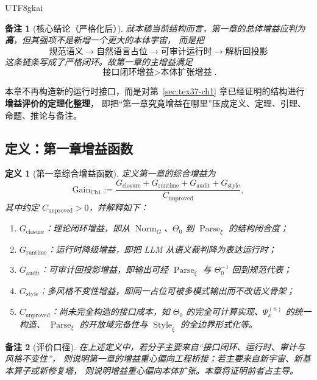 \documentclass[12pt]{article}
\newtheorem{definition}{定义}[section]
\newtheorem{remark}{备注}[section]
\newcommand{\Norm}{\operatorname{Norm}}
\newcommand{\Parse}{\operatorname{Parse}}
\newcommand{\Style}{\operatorname{Style}}
\begin{document}
\begin{CJK*}{UTF8}{gkai}
\begin{remark}[核心结论（严格化后）]
就本稿当前结构而言，第一章的总体增益应判为\textbf{高}，但其强项不是新增一个更大的本体宇宙，
而是把
\[
  \text{规范语义}
  \to
  \text{自然语言占位}
  \to
  \text{可审计运行时}
  \to
  \text{解析回投影}
\]
这条链条写成了严格闭环。故第一章的主增益满足
\[
  \boxed{
    \text{接口闭环增益}
    >
    \text{本体扩张增益}
  }.
\]
\end{remark}

本章不再构造新的运行时接口，而是对第~\ref{sec:tex37-ch1} 章已经证明的结构进行\textbf{增益评价的定理化整理}，
即把“第一章究竟增益在哪里”压成定义、定理、引理、命题、推论与备注。

\subsection{定义：第一章增益函数}
\label{subsec:tex37-gain-definition}

\begin{definition}[第一章综合增益函数]
\label{def:tex37-gain-function}
定义第一章的综合增益为
\[
  \mathrm{Gain}_{\mathrm{Ch1}}
  :=
  \frac{
    G_{\mathrm{closure}}
    +
    G_{\mathrm{runtime}}
    +
    G_{\mathrm{audit}}
    +
    G_{\mathrm{style}}
  }{
    C_{\mathrm{unproved}}
  },
\]
其中约定 $C_{\mathrm{unproved}}>0$，并解释如下：
\begin{enumerate}
  \item $G_{\mathrm{closure}}$：理论闭环增益，即从 $\Norm_G$、$\Theta_0$ 到 $\Parse_\xi$ 的结构闭合度；
  \item $G_{\mathrm{runtime}}$：运行时降级增益，即把 LLM 从语义裁判降为表达运行时；
  \item $G_{\mathrm{audit}}$：可审计回投影增益，即输出可经 $\Parse_\xi$ 与 $\Theta_0^{-1}$ 回到规范代表；
  \item $G_{\mathrm{style}}$：多风格不变性增益，即同一占位可被多模式输出而不改语义骨架；
  \item $C_{\mathrm{unproved}}$：尚未完全构造的接口成本，如 $\Theta_0$ 的完全可计算实现、$\Psi_x^{(n)}$ 的统一构造、
  $\Parse_\xi$ 的开放域完备性与 $\Style_\xi$ 的全边界形式化等。
\end{enumerate}
\end{definition}

\begin{remark}[评价口径]
在上述定义中，若分子主要来自“接口闭环、运行时、审计与风格不变性”，
则说明第一章的增益重心偏向工程桥接；若主要来自新宇宙、新基本算子或新修复塔，
则说明增益重心偏向本体扩张。本章将证明前者占主导。
\end{remark}


\end{CJK*}
\end{document}
